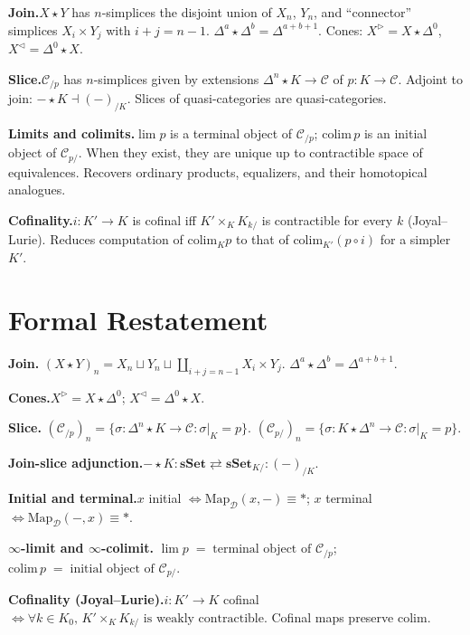 \begin{summarybox}
\textbf{Join.}\quad $X \star Y$ has $n$-simplices the disjoint union of
$X_n$, $Y_n$, and ``connector'' simplices $X_i \times Y_j$ with $i+j = n-1$.
$\Delta^a \star \Delta^b = \Delta^{a+b+1}$. Cones:
$X^\rhd = X \star \Delta^0$, $X^\lhd = \Delta^0 \star X$.

\textbf{Slice.}\quad $\mathcal{C}_{/p}$ has $n$-simplices given by
extensions $\Delta^n \star K \to \mathcal{C}$ of $p : K \to \mathcal{C}$.
Adjoint to join: $- \star K \dashv (-)_{/K}$. Slices of quasi-categories
are quasi-categories.

\textbf{Limits and colimits.}\quad $\lim p$ is a terminal object of
$\mathcal{C}_{/p}$; $\mathrm{colim}\, p$ is an initial object of
$\mathcal{C}_{p/}$. When they exist, they are unique up to contractible
space of equivalences. Recovers ordinary products, equalizers, and
their homotopical analogues.

\textbf{Cofinality.}\quad $i : K' \to K$ is cofinal iff
$K' \times_K K_{k/}$ is contractible for every $k$ (Joyal–Lurie).
Reduces computation of $\mathrm{colim}_K p$ to that of
$\mathrm{colim}_{K'}(p \circ i)$ for a simpler $K'$.
\end{summarybox}


\section*{Formal Restatement}

\begin{formalrestatement}
\textbf{Join.}\quad
$(X \star Y)_n = X_n \sqcup Y_n \sqcup \coprod_{i+j=n-1} X_i \times Y_j$.
$\Delta^a \star \Delta^b = \Delta^{a+b+1}$.

\medskip
\textbf{Cones.}\quad $X^\rhd = X \star \Delta^0$;
$X^\lhd = \Delta^0 \star X$.

\medskip
\textbf{Slice.}\quad
$(\mathcal{C}_{/p})_n = \{\sigma : \Delta^n \star K \to \mathcal{C} :
\sigma|_K = p\}$.
$(\mathcal{C}_{p/})_n = \{\sigma : K \star \Delta^n \to \mathcal{C} :
\sigma|_K = p\}$.

\medskip
\textbf{Join-slice adjunction.}\quad $- \star K : \mathbf{sSet} \rightleftarrows
\mathbf{sSet}_{K/} : (-)_{/K}$.

\medskip
\textbf{Initial and terminal.}\quad $x$ initial $\iff \mathrm{Map}_\mathcal{D}(x, -)
\equiv *$; $x$ terminal $\iff \mathrm{Map}_\mathcal{D}(-, x) \equiv *$.

\medskip
\textbf{$\infty$-limit and $\infty$-colimit.}\quad
$\lim p \;=\; \text{terminal object of } \mathcal{C}_{/p}$;
$\mathrm{colim}\, p \;=\; \text{initial object of } \mathcal{C}_{p/}$.

\medskip
\textbf{Cofinality (Joyal–Lurie).}\quad $i : K' \to K$ cofinal $\iff
\forall k \in K_0,\, K' \times_K K_{k/} \text{ is weakly contractible}$.
Cofinal maps preserve $\mathrm{colim}$.
\end{formalrestatement}
